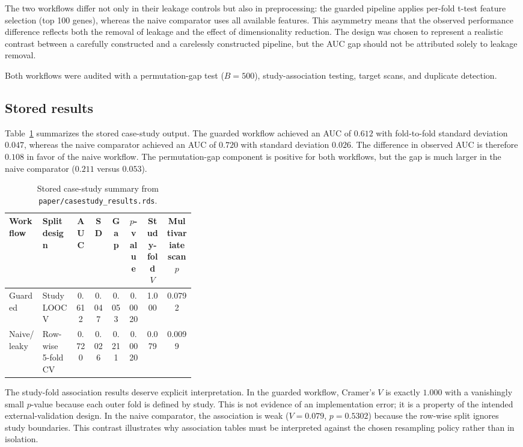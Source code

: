 \documentclass[article]{jss}
\begin{document}
The two workflows differ not only in their leakage controls but also in
preprocessing: the guarded pipeline applies per-fold t-test feature selection
(top 100 genes), whereas the naive comparator uses all available features.
This asymmetry means that the observed performance difference reflects both
the removal of leakage and the effect of dimensionality reduction. The design
was chosen to represent a realistic contrast between a carefully constructed
and a carelessly constructed pipeline, but the AUC gap should not be
attributed solely to leakage removal.

Both workflows were audited with a permutation-gap test
($B = 500$), study-association testing, target scans, and duplicate detection.

\subsection{Stored results}

Table~\ref{tab:case-study} summarizes the stored case-study output. The guarded
workflow achieved an AUC of $0.612$ with fold-to-fold standard deviation
$0.047$, whereas the naive comparator achieved an AUC of $0.720$ with standard
deviation $0.026$. The difference in observed AUC is therefore $0.108$ in favor
of the naive workflow. The permutation-gap component is positive for both
workflows, but the gap is much larger in the naive comparator ($0.211$ versus
$0.053$).

\begin{table}[tbp]
\centering
\caption{Stored case-study summary from \texttt{paper/casestudy\_results.rds}.}
\label{tab:case-study}
\begin{tabular}{|p{0.18\linewidth}|p{0.18\linewidth}|c|c|c|c|c|c|}
\hline
\textbf{Workflow} & \textbf{Split design} & \textbf{AUC} & \textbf{SD} & \textbf{Gap} & \textbf{$p$-value} & \textbf{Study-fold $V$} & \textbf{Multivariate scan $p$} \\
\hline
Guarded & Study LOOCV & 0.612 & 0.047 & 0.053 & 0.0020 & 1.000 & 0.0792 \\
\hline
Naive/leaky & Row-wise 5-fold CV & 0.720 & 0.026 & 0.211 & 0.0020 & 0.079 & 0.0099 \\
\hline
\end{tabular}
\end{table}

The study-fold association results deserve explicit interpretation. In the
guarded workflow, Cramer's $V$ is exactly $1.000$ with a vanishingly small
$p$-value because each outer fold is defined by study. This is not evidence of
an implementation error; it is a property of the intended external-validation
design. In the naive comparator, the association is weak ($V = 0.079$,
$p = 0.5302$) because the row-wise split ignores study boundaries. This
contrast illustrates why association tables must be interpreted against the
chosen resampling policy rather than in isolation.
\end{document}
